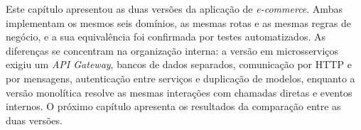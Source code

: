 Este capítulo apresentou as duas versões da aplicação de \textit{e-commerce}. Ambas implementam
os mesmos seis domínios, as mesmas rotas e as mesmas regras de negócio, e a sua equivalência foi
confirmada por testes automatizados. As diferenças se concentram na organização interna: a
versão em microsserviços exigiu um \textit{API Gateway}, bancos de dados separados, comunicação
por HTTP e por mensagens, autenticação entre serviços e duplicação de modelos, enquanto a versão
monolítica resolve as mesmas interações com chamadas diretas e eventos internos. O próximo
capítulo apresenta os resultados da comparação entre as duas versões.
